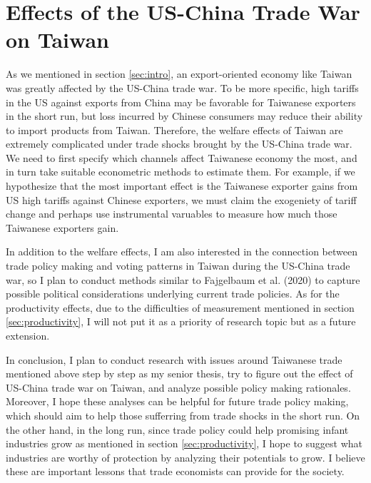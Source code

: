 \documentclass[12pt]{article}
\begin{document}
\section{Effects of the US-China Trade War on Taiwan}
\label{sec:Taiwan}
As we mentioned in section \ref{sec:intro}, an export-oriented economy like Taiwan was greatly affected by the US-China trade war.
To be more specific, high tariffs in the US against exports from China may be favorable for Taiwanese exporters in the short run, 
but loss incurred by Chinese consumers may reduce their ability to import products from Taiwan.
Therefore, the welfare effects of Taiwan are extremely complicated under trade shocks brought by the US-China trade war.
We need to first specify which channels affect Taiwanese economy the most, and in turn take suitable econometric methods to estimate them.
For example, if we hypothesize that the most important effect is the Taiwanese exporter gains from US high tariffs against Chinese exporters, 
we must claim the exogeniety of tariff change and perhaps use instrumental varuables to measure how much those Taiwanese exporters gain. 

In addition to the welfare effects, I am also interested in the connection between trade policy making and voting patterns in Taiwan during the US-China trade war, 
so I plan to conduct methods similar to Fajgelbaum et al. (2020) \cite{fajgelbaum2020return} to capture possible political considerations underlying current trade policies.
As for the productivity effects, due to the difficulties of measurement mentioned in section \ref{sec:productivity}, I will not put it as a priority of research topic but as a future extension. 

In conclusion, I plan to conduct research with issues around Taiwanese trade mentioned above step by step as my senior thesis, 
try to figure out the effect of US-China trade war on Taiwan, and analyze possible policy making rationales. 
Moreover, I hope these analyses can be helpful for future trade policy making, which should aim to help those sufferring from trade shocks in the short run.
On the other hand, in the long run, since trade policy could help promising infant industries grow as mentioned in section \ref{sec:productivity}, 
I hope to suggest what industries are worthy of protection by analyzing their potentials to grow. 
I believe these are important lessons that trade economists can provide for the society.




\end{document}
